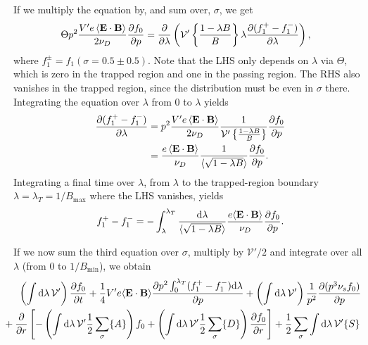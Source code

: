 \documentclass[11pt,a4paper]{article}
\newcommand{\rd}{\ensuremath{\mathrm{d}}}
\newcommand{\sub}[1]{\ensuremath{_{\text{#1}}}}
\renewcommand{\b}[1]{\ensuremath{ {\bf #1 } }}
\begin{document}
If we multiply the equation by, and sum over, $\sigma$, we get
\begin{align}
\Theta  p^2\frac{V'e \left\langle \b{E}\cdot\b{B}\right\rangle}{2\nu_D}\frac{\partial  f_0}{\partial p } &=  \frac{\partial}{\partial \lambda}\left(  \mathcal{V'}\left\{\frac{1-\lambda B}{B}\right\} \lambda\frac{\partial( f_1^+ - f_1^-)}{\partial \lambda}\right), 
\end{align} 
where $f_1^{\pm} = f_1(\sigma = 0.5\pm0.5)$.
Note that the LHS only depends on $\lambda$ via $\Theta$, which is zero in the trapped region and one in the passing region. The RHS also vanishes in the trapped region, since the distribution must be even in $\sigma$ there. Integrating the equation over $\lambda$ from 0 to $\lambda$ yields
\begin{align}
\frac{\partial (f_1^+-f_1^-)}{\partial \lambda} &=  p^2\frac{V'e \left\langle \b{E}\cdot\b{B}\right\rangle}{2\nu_D}\frac{1}{\mathcal{V}' \left\{\frac{1-\lambda B}{B}\right\}}\frac{\partial f_0}{\partial p } \nonumber \\
&= \frac{e \left\langle \b{E}\cdot\b{B}\right\rangle}{\nu_D}\frac{1}{\langle \sqrt{1-\lambda B}\rangle} \frac{\partial f_0}{\partial p}.
\end{align}
Integrating a final time over $\lambda$, from $\lambda$ to the trapped-region boundary $\lambda=\lambda_T = 1/B\sub{max}$ where the LHS vanishes, yields
\begin{align}
f_1^+-f_1^- = -\int_\lambda^{\lambda_T} \frac{\rd \lambda}{\langle\sqrt{1-\lambda B}\rangle} \frac{ e \langle \b{E}\cdot\b{B}\rangle}{\nu_D}\frac{\partial f_0}{\partial p}.
\end{align}

If we now sum the third equation over $\sigma$, multiply by $\mathcal{V}'/2$ and integrate over all $\lambda$ (from 0 to $1/B\sub{min}$), we obtain
\begin{align}
\left(\int \rd \lambda \, \mathcal{V}' \right)\frac{\partial f_0}{\partial t} &+\frac{1}{4} V' e\langle \b{E}\cdot\b{B}\rangle \frac{\partial p^2\int_0^{\lambda_T}(f_1^+-f_1^-)\rd\lambda}{\partial p} +\left(\int \rd \lambda \, \mathcal{V}' \right)\frac{1}{p^2}\frac{\partial(p^3 \nu_s f_0)}{\partial p}\nonumber \\
&\hspace{-30mm} +\frac{\partial}{\partial r}\left[ -\left(\int \rd \lambda \, \mathcal{V}' \frac{1}{2}\sum_\sigma\{A\}\right)f_0+  \left(\int \rd \lambda \, \mathcal{V}' \frac{1}{2}\sum_\sigma\{D\}\right)\frac{\partial f_0}{\partial r}\right] + \frac{1}{2}\sum_\sigma\int\rd\lambda\,\mathcal{V}' \{S\}
\end{align}
\end{document}
